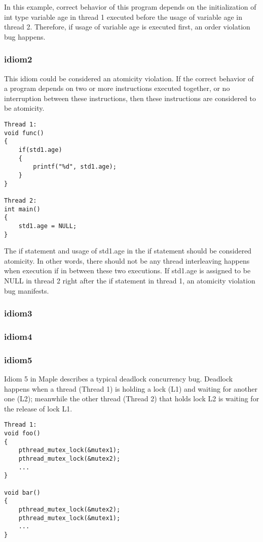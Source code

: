 \documentclass[twocolumn]{article}
\begin{document}
In this example, correct behavior of this program depends on the initialization of int type variable age in thread 1 executed before the usage of variable age in thread 2. Therefore, if usage of variable age is executed first, an order violation bug happens. 

\subsubsection{idiom2}
This idiom could be considered an atomicity violation. If the correct behavior of a program depends on two or more instructions executed together, or no interruption between these instructions, then these instructions are considered to be atomicity. 

\begin{lstlisting}
Thread 1:
void func()
{
	if(std1.age) 
	{
		printf("%d", std1.age);
	}
}

Thread 2:
int main()
{
	std1.age = NULL;
}
\end{lstlisting}

The if statement and usage of std1.age in the if statement should be considered atomicity. In other words, there should not be any thread interleaving happens when execution if in between these two executions. If std1.age is assigned to be NULL in thread 2 right after the if statement in thread 1, an atomicity violation bug manifests. 



\subsubsection{idiom3}

\subsubsection{idiom4}

\subsubsection{idiom5}

Idiom 5 in Maple describes a typical deadlock concurrency bug. Deadlock happens when a thread (Thread 1) is holding a lock (L1) and waiting for another one (L2); meanwhile the other thread (Thread 2) that holds lock L2 is waiting for the release of lock L1. 

\begin{lstlisting}
Thread 1:
void foo()
{
	pthread_mutex_lock(&mutex1);
	pthread_mutex_lock(&mutex2);
	...
}

void bar()
{
	pthread_mutex_lock(&mutex2);
	pthread_mutex_lock(&mutex1);
	...
}
\end{lstlisting}
\end{document}
